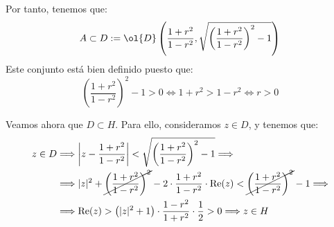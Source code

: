 \begin{ejercicio}
\begin{description}
                Por tanto, tenemos que:
                \begin{equation*}
                    A\subset D:=\ol{D}\left(\dfrac{1+r^2}{1-r^2},\sqrt{\left(\dfrac{1+r^2}{1-r^2}\right)^2-1}\right)
                \end{equation*}
                Este conjunto está bien definido puesto que:
                \begin{equation*}
                    \left(\dfrac{1+r^2}{1-r^2}\right)^2-1>0\iff 1+r^2>1-r^2\iff r>0
                \end{equation*}

                Veamos ahora que $D\subset H$. Para ello, consideramos $z\in D$, y tenemos que:
                \begin{align*}
                    z\in D &\Longrightarrow
                    \left|z-\dfrac{1+r^2}{1-r^2}\right|<\sqrt{\left(\dfrac{1+r^2}{1-r^2}\right)^2-1}
                    \Longrightarrow \\ &\Longrightarrow
                    |z|^2+\cancel{\left(\dfrac{1+r^2}{1-r^2}\right)^2}-2\cdot \dfrac{1+r^2}{1-r^2}\cdot \Re(z)<\cancel{\left(\dfrac{1+r^2}{1-r^2}\right)^2}-1
                    \Longrightarrow \\ &\Longrightarrow
                    \Re(z)>\left(|z|^2+1\right)\cdot \dfrac{1-r^2}{1+r^2}\cdot \dfrac{1}{2}>0
                    \Longrightarrow z\in H
                \end{align*}


\end{description}
\end{ejercicio}

